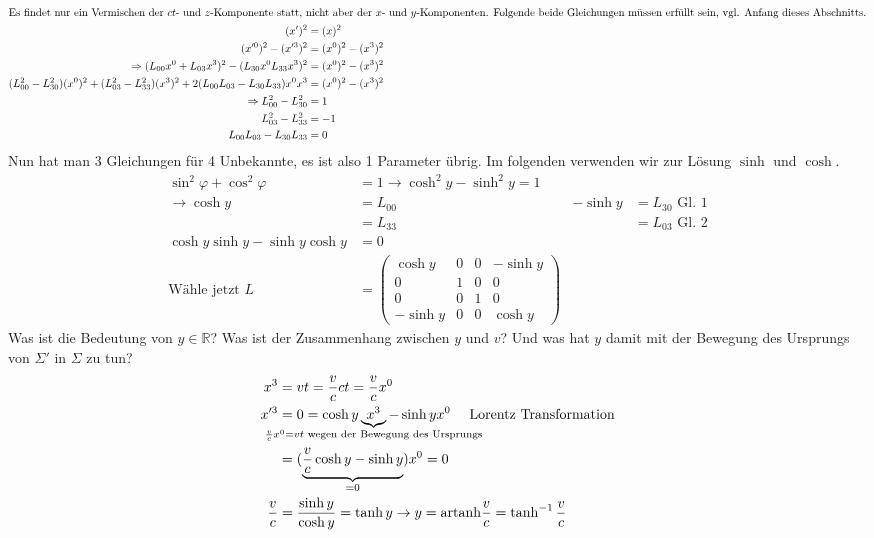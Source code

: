 \documentclass[oneside]{book}
\theoremstyle{definition}
\newcommand{\vp}{\varphi}
\renewcommand{\Re}{\mathbb{R}}
\begin{document}
\begin{align*}
\intertext{Es findet nur ein Vermischen der $ct$- und $z$-Komponente statt, nicht aber der $x$- und $y$-Komponenten. Folgende beide Gleichungen müssen erfüllt sein, vgl. Anfang dieses Abschnitts.}
(x')^2 &= (x)^2\\
(x'^0)^2 - (x'^3)^2 &= (x^0)^2 - (x^3)^2\\
\Rightarrow (L_{00}x^0 + L_{03}x^3)^2 - (L_{30} x^0 L_{33}x^3)^2 &= (x^0)^2 - (x^3)^2\\
(L_{00}^2-L_{30}^2)(x^0)^2 + (L_{03}^2 - L_{33}^2)(x^3)^2 + 2(L_{00}L_{03} - L_{30} L_{33})x^0 x^3 &= (x^0)^2 - (x^3)^2\\
\Rightarrow L_{00}^2 - L_{30}^2 &= 1\\
L_{03}^2 - L_{33}^2 &= -1\\
L_{00}L_{03} - L_{30}L_{33} &= 0
\end{align*}
Nun hat man 3 Gleichungen für 4 Unbekannte, es ist also 1 Parameter übrig. Im folgenden verwenden wir zur Lösung $\sinh$ und $\cosh$.
\begin{align*}
\sin^2 \vp + \cos^2\vp &= 1 \rightarrow \cosh^2 y - \sinh^2 y = 1\\
\rightarrow \cosh y &= L_{00}  & -\sinh y &= L_{30} \text{~Gl. 1}\\
&= L_{33} &  &= L_{03} \text{~Gl. 2}\\
\cosh y \sinh y - \sinh y \cosh y &= 0\\
\text{Wähle jetzt~}
L &= \begin{pmatrix}
\cosh y & 0 & 0 & - \sinh y\\
0 & 1 & 0 & 0\\
0 & 0 & 1 & 0\\
-\sinh y & 0 & 0 & \cosh y 
\end{pmatrix}
\end{align*}
Was ist die Bedeutung von $y \in \Re$? Was ist der Zusammenhang zwischen $y$ und $v$? Und was hat $y$ damit mit der Bewegung des Ursprungs von $\Sigma'$ in $\Sigma$ zu tun?
\begin{align*}
x^3 &= v t = \frac{v}{c} c t = \frac{v}{c} x^0\\
x'^3 &= 0 = \cosh y \underbrace{x^3}_{\text{\hspace{-10em}}\frac{v}{c} x^0 = v t \text{~wegen der Bewegung des Ursprungs}\text{\hspace{-10em}}} - \sinh y x^0 \text{~~~~Lorentz Transformation}\\
&= (\underbrace{\frac{v}{c} \cosh y - \sinh y}_{=0})x^0 = 0\\
\frac{v}{c} &= \frac{\sinh y}{\cosh y} = \tanh y \rightarrow y = \text{artanh}\frac{v}{c} = \tanh^{-1} \frac{v}{c}
\end{align*}
\end{document}
